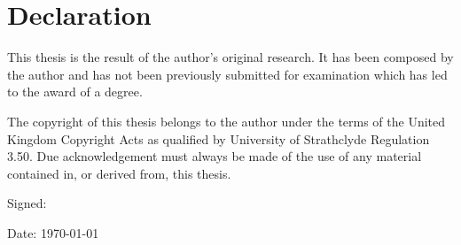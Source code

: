 \chapter*{Declaration}
This thesis is the result of the author's original research. It has been composed by the author and has not been previously submitted for examination which has led to the award of a degree.

\vspace{1em}
\noindent The copyright of this thesis belongs to the author under the terms of the United Kingdom Copyright Acts as qualified by University of Strathclyde Regulation 3.50. Due acknowledgement must always be made of the use of any material contained in, or derived from, this thesis.

\vspace{1em}
\noindent Signed:

\vspace{1em}
\noindent Date: \today
